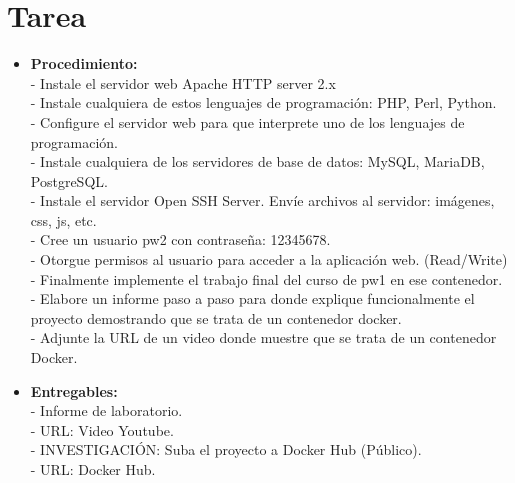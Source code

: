 \documentclass{article}
\begin{document}
\section{Tarea}
\begin{itemize}
	\item \textbf{Procedimiento:}
	      \\- Instale el servidor web Apache HTTP server 2.x
		  \\- Instale cualquiera de estos lenguajes de programación: PHP, Perl, Python.
		  \\- Configure el servidor web para que interprete uno de los lenguajes de programación.
		  \\- Instale cualquiera de los servidores de base de datos: MySQL, MariaDB, PostgreSQL.
		  \\- Instale el servidor Open SSH Server. Envíe archivos al servidor: imágenes, css, js, etc.
		  \\- Cree un usuario pw2 con contraseña: 12345678.
		  \\- Otorgue permisos al usuario para acceder a la aplicación web. (Read/Write)
		  \\- Finalmente implemente el trabajo final del curso de pw1 en ese contenedor.
		  \\- Elabore un informe paso a paso para donde explique funcionalmente el proyecto demostrando que se trata de un contenedor docker.
		  \\- Adjunte la URL de un video donde muestre que se trata de un contenedor Docker.
	\item \textbf{Entregables:}
	      \\- Informe de laboratorio.
		  \\- URL: Video Youtube.
		  \\- INVESTIGACIÓN: Suba el proyecto a Docker Hub (Público).
		  \\- URL: Docker Hub. 
\end{itemize}
\pagebreak
\end{document}
